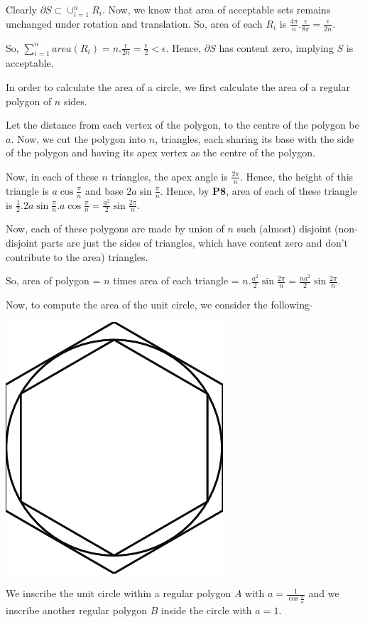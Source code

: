 \documentclass[11pt]{amsart}
\theoremstyle{definition}
\begin{document}
\begin{enumerate}[wide, labelwidth=!, labelindent=0pt]
Clearly $\partial S \subset \cup_{i = 1}^{n} R_i$. Now, we know that area of acceptable sets remains unchanged under rotation and translation. So, area of each $R_i$ is $\frac{4\pi}{n}.\frac{\epsilon}{8\pi} = \frac{\epsilon}{2n}$.

So, $\sum_{i = 1}^{n} area(R_i) = n.\frac{\epsilon}{2n} = \frac{\epsilon}{2} < \epsilon$. Hence, $\partial S$ has content zero, implying $S$ is acceptable.

In order to calculate the area of a circle, we first calculate the area of a regular polygon of $n$ sides.

Let the distance from each vertex of the polygon, to the centre of the polygon be $a$. Now, we cut the polygon into $n$, triangles, each sharing its base with the side of the polygon and having its apex vertex as the centre of the polygon.

Now, in each of these $n$ triangles, the apex angle is $\frac{2\pi}{n}$. Hence, the height of this triangle is $a \cos{\frac{\pi}{n}}$ and base $2a \sin{\frac{\pi}{n}}$. Hence, by \textbf{P8}, area of each of these triangle is $\frac{1}{2}.2a \sin{\frac{\pi}{n}}.a \cos{\frac{\pi}{n}} = \frac{a^2}{2} \sin{\frac{2\pi}{n}}$.

Now, each of these polygons are made by union of $n$ such (almost) disjoint (non-disjoint parts are just the sides of triangles, which have content zero  and don't contribute to the area) triangles.

So, area of polygon = $n$ times area of each triangle = $n.\frac{a^2}{2} \sin{\frac{2\pi}{n}} = \frac{na^2}{2} \sin{\frac{2\pi}{n}}$.

Now, to compute the area of the unit circle, we consider the following-
\begin{center}
\includegraphics[scale = 0.3]{images/circle.png}   
\end{center}
We inscribe the unit circle within a regular polygon $A$ with $a = \frac{1}{\cos{\frac{\pi}{n}}}$ and we inscribe another regular polygon $B$ inside the circle with $a = 1$.


\end{enumerate}
\end{document}
